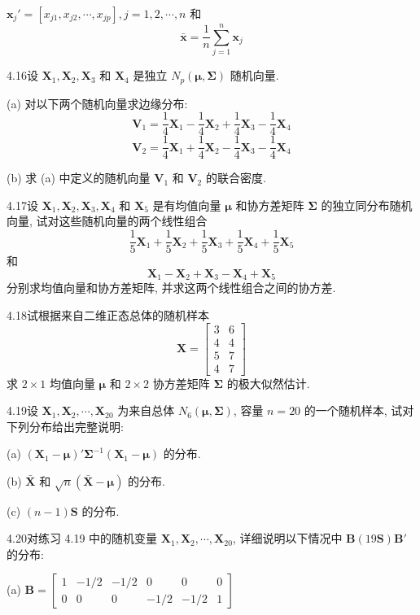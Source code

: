 $\mathbf{x}_{j}'=[x_{j1},x_{j2},\cdots,x_{jp}],j=1,2,\cdots,n$ 和
\[
\bar{\mathbf{x}}=\frac{1}{n}\sum_{j=1}^{n}\mathbf{x}_{j}
\]

4.16\quad 设 $\mathbf{X}_{1},\mathbf{X}_{2},\mathbf{X}_{3}$ 和 $\mathbf{X}_{4}$ 是独立 $N_{p}(\boldsymbol{\mu},\boldsymbol{\Sigma})$ 随机向量.

(a) 对以下两个随机向量求边缘分布:
\[
\mathbf{V}_{1}=\frac{1}{4}\mathbf{X}_{1}-\frac{1}{4}\mathbf{X}_{2}+\frac{1}{4}\mathbf{X}_{3}-\frac{1}{4}\mathbf{X}_{4}
\]
\[
\mathbf{V}_{2}=\frac{1}{4}\mathbf{X}_{1}+\frac{1}{4}\mathbf{X}_{2}-\frac{1}{4}\mathbf{X}_{3}-\frac{1}{4}\mathbf{X}_{4}
\]

(b) 求 (a) 中定义的随机向量 $\mathbf{V}_{1}$ 和 $\mathbf{V}_{2}$ 的联合密度.

4.17\quad 设 $\mathbf{X}_{1},\mathbf{X}_{2},\mathbf{X}_{3},\mathbf{X}_{4}$ 和 $\mathbf{X}_{5}$ 是有均值向量 $\boldsymbol{\mu}$ 和协方差矩阵 $\boldsymbol{\Sigma}$ 的独立同分布随机向量, 试对这些随机向量的两个线性组合
\[
\frac{1}{5}\mathbf{X}_{1}+\frac{1}{5}\mathbf{X}_{2}+\frac{1}{5}\mathbf{X}_{3}+\frac{1}{5}\mathbf{X}_{4}+\frac{1}{5}\mathbf{X}_{5}
\]
和
\[
\mathbf{X}_{1}-\mathbf{X}_{2}+\mathbf{X}_{3}-\mathbf{X}_{4}+\mathbf{X}_{5}
\]
分别求均值向量和协方差矩阵, 并求这两个线性组合之间的协方差.

4.18\quad 试根据来自二维正态总体的随机样本
\[
\mathbf{X}=\begin{bmatrix}3&6\\4&4\\5&7\\4&7\end{bmatrix}
\]
求 $2\times 1$ 均值向量 $\boldsymbol{\mu}$ 和 $2\times 2$ 协方差矩阵 $\boldsymbol{\Sigma}$ 的极大似然估计.

4.19\quad 设 $\mathbf{X}_{1},\mathbf{X}_{2},\cdots,\mathbf{X}_{20}$ 为来自总体 $N_{6}(\boldsymbol{\mu},\boldsymbol{\Sigma})$, 容量 $n=20$ 的一个随机样本, 试对下列分布给出完整说明:

(a) $(\mathbf{X}_{1}-\boldsymbol{\mu})'\boldsymbol{\Sigma}^{-1}(\mathbf{X}_{1}-\boldsymbol{\mu})$ 的分布.

(b) $\bar{\mathbf{X}}$ 和 $\sqrt{n}(\bar{\mathbf{X}}-\boldsymbol{\mu})$ 的分布.

(c) $(n-1)\mathbf{S}$ 的分布.

4.20\quad 对练习 4.19 中的随机变量 $\mathbf{X}_{1},\mathbf{X}_{2},\cdots,\mathbf{X}_{20}$, 详细说明以下情况中 $\mathbf{B}(19\mathbf{S})\mathbf{B}'$ 的分布:

(a) $\mathbf{B}=\begin{bmatrix}1&-1/2&-1/2&0&0&0\\0&0&0&-1/2&-1/2&1\end{bmatrix}$


